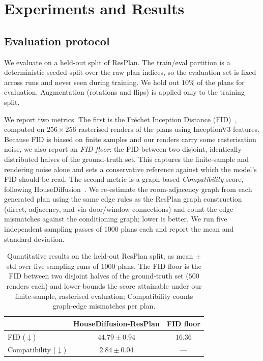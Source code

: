 \section{Experiments and Results}
\label{Results}

\subsection{Evaluation protocol}
We evaluate on a held-out split of ResPlan. The train/eval partition is a
deterministic seeded split over the raw plan indices, so the evaluation set is
fixed across runs and never seen during training. We hold out $10\%$ of the plans
for evaluation. Augmentation (rotations and flips) is applied only to the training
split.

We report two metrics. The first is the Fr\'echet Inception Distance
(FID)~\cite{FID}, computed on $256\times256$ rasterised renders of the plans using
InceptionV3 features. Because FID is biased on finite samples and our renders carry
some rasterisation noise, we also report an \emph{FID floor}: the FID between two
disjoint, identically distributed halves of the ground-truth set. This captures the
finite-sample and rendering noise alone and sets a conservative reference against
which the model's FID should be read. The second metric is a graph-based \emph{Compatibility} score,
following HouseDiffusion~\cite{HouseDiffusion}. We re-estimate the room-adjacency
graph from each generated plan using the same edge rules as the ResPlan graph
construction (direct, adjacency, and via-door/window connections) and count the
edge mismatches against the conditioning graph; lower is better. We run five
independent sampling passes of $1000$ plans each and report the mean and standard
deviation.

\begin{table}[t]
  \centering
  \small
  \setlength{\tabcolsep}{6pt}
  \renewcommand{\arraystretch}{1.15}
  \begin{tabular}{@{}l c c@{}}
    \toprule
    & HouseDiffusion-ResPlan & FID floor \\
    \midrule
    FID ($\downarrow$)           & $44.79 \pm 0.94$ & $16.36$ \\
    Compatibility ($\downarrow$) & $2.84 \pm 0.04$  & --- \\
    \bottomrule
  \end{tabular}
  \caption{Quantitative results on the held-out ResPlan split, as mean $\pm$ std
  over five sampling runs of $1000$ plans. The FID floor is the FID between two
  disjoint halves of the ground-truth set ($500$ renders each) and lower-bounds
  the score attainable under our finite-sample, rasterised evaluation;
  Compatibility counts graph-edge mismatches per plan.}
  \label{tab:results}
\end{table}

